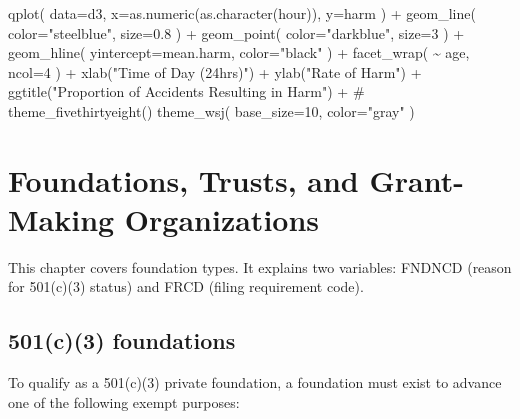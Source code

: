 \documentclass[
  letterpaper,
  DIV=11,
  numbers=noendperiod]{scrreprt}
\newenvironment{Shaded}{\begin{snugshade}}{\end{snugshade}}
\newcommand{\AttributeTok}[1]{\textcolor[rgb]{0.40,0.45,0.13}{#1}}
\newcommand{\CommentTok}[1]{\textcolor[rgb]{0.37,0.37,0.37}{#1}}
\newcommand{\DecValTok}[1]{\textcolor[rgb]{0.68,0.00,0.00}{#1}}
\newcommand{\FloatTok}[1]{\textcolor[rgb]{0.68,0.00,0.00}{#1}}
\newcommand{\FunctionTok}[1]{\textcolor[rgb]{0.28,0.35,0.67}{#1}}
\newcommand{\NormalTok}[1]{\textcolor[rgb]{0.00,0.23,0.31}{#1}}
\newcommand{\SpecialCharTok}[1]{\textcolor[rgb]{0.37,0.37,0.37}{#1}}
\newcommand{\StringTok}[1]{\textcolor[rgb]{0.13,0.47,0.30}{#1}}
\begin{document}
\begin{Shaded}
\begin{Highlighting}[]
\FunctionTok{qplot}\NormalTok{( }\AttributeTok{data=}\NormalTok{d3, }\AttributeTok{x=}\FunctionTok{as.numeric}\NormalTok{(}\FunctionTok{as.character}\NormalTok{(hour)), }\AttributeTok{y=}\NormalTok{harm ) }\SpecialCharTok{+} 
  \FunctionTok{geom\_line}\NormalTok{( }\AttributeTok{color=}\StringTok{"steelblue"}\NormalTok{, }\AttributeTok{size=}\FloatTok{0.8}\NormalTok{ ) }\SpecialCharTok{+} 
  \FunctionTok{geom\_point}\NormalTok{( }\AttributeTok{color=}\StringTok{"darkblue"}\NormalTok{, }\AttributeTok{size=}\DecValTok{3}\NormalTok{ ) }\SpecialCharTok{+} 
  \FunctionTok{geom\_hline}\NormalTok{( }\AttributeTok{yintercept=}\NormalTok{mean.harm, }\AttributeTok{color=}\StringTok{"black"}\NormalTok{ ) }\SpecialCharTok{+} 
  \FunctionTok{facet\_wrap}\NormalTok{( }\SpecialCharTok{\textasciitilde{}}\NormalTok{ age, }\AttributeTok{ncol=}\DecValTok{4}\NormalTok{ ) }\SpecialCharTok{+} 
  \FunctionTok{xlab}\NormalTok{(}\StringTok{"Time of Day (24hrs)"}\NormalTok{) }\SpecialCharTok{+} \FunctionTok{ylab}\NormalTok{(}\StringTok{"Rate of Harm"}\NormalTok{) }\SpecialCharTok{+}
  \FunctionTok{ggtitle}\NormalTok{(}\StringTok{"Proportion of Accidents Resulting in Harm"}\NormalTok{) }\SpecialCharTok{+}
  \CommentTok{\# theme\_fivethirtyeight() }
  \FunctionTok{theme\_wsj}\NormalTok{( }\AttributeTok{base\_size=}\DecValTok{10}\NormalTok{, }\AttributeTok{color=}\StringTok{"gray"}\NormalTok{ )}
\end{Highlighting}
\end{Shaded}


\hypertarget{foundations-trusts-and-grant-making-organizations}{%
\chapter{Foundations, Trusts, and Grant-Making
Organizations}\label{foundations-trusts-and-grant-making-organizations}}

This chapter covers foundation types. It explains two variables: FNDNCD
(reason for 501(c)(3) status) and FRCD (filing requirement code).

\hypertarget{c3-foundations}{%
\section{501(c)(3) foundations}\label{c3-foundations}}

To qualify as a 501(c)(3) private foundation, a foundation must exist to
advance one of the following exempt purposes:
\end{document}
